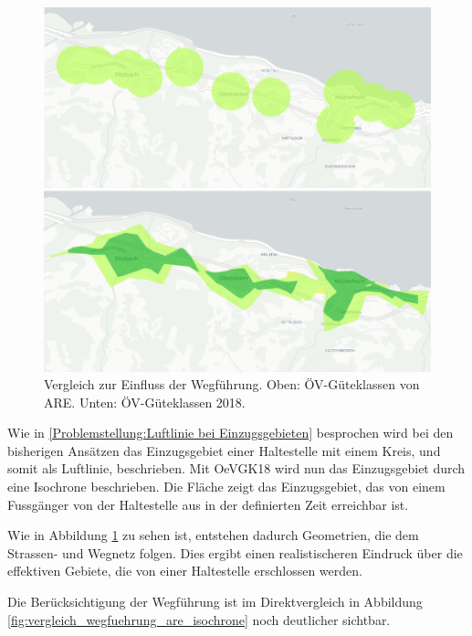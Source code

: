 \begin{figure}[ht]
    \centering
    \includegraphics[width=0.8\linewidth]{technicalreport/img/vergleich_wegfuehrung}
    \caption[Vergleich zur Einfluss der Wegführung]{Vergleich zur Einfluss der Wegführung. Oben: ÖV-Güteklassen von \ac{ARE}. Unten: ÖV-Güteklassen 2018.}
    \label{fig:vergleich_wegfuehrung}
\end{figure}

Wie in \ref{Problemstellung:Luftlinie bei Einzugsgebieten} besprochen wird bei den bisherigen Ansätzen das Einzugsgebiet einer \gls{Haltestelle} mit einem Kreis, und somit als Luftlinie, beschrieben.
Mit \gls{OeVGK18} wird nun das Einzugsgebiet durch eine \gls{Isochrone} beschrieben.
Die Fläche zeigt das Einzugsgebiet, das von einem Fussgänger von der \gls{Haltestelle} aus in der definierten Zeit erreichbar ist.

Wie in Abbildung \ref{fig:vergleich_wegfuehrung} zu sehen ist, entstehen dadurch Geometrien, die dem Strassen- und Wegnetz folgen.
Dies ergibt einen realistischeren Eindruck über die effektiven Gebiete, die von einer \gls{Haltestelle} erschlossen werden.

Die Berücksichtigung der Wegführung ist im Direktvergleich in Abbildung \ref{fig:vergleich_wegfuehrung_are_isochrone} noch deutlicher sichtbar.

